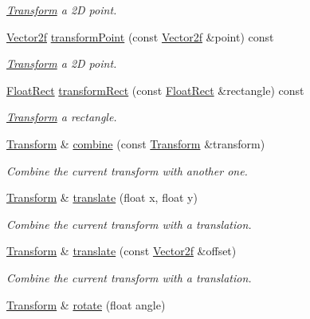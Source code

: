 \begin{DoxyCompactItemize}
\begin{DoxyCompactList}\small\item\em \hyperlink{classsf_1_1_transform}{Transform} a 2D point. \end{DoxyCompactList}\item 
\hyperlink{classsf_1_1_vector2}{Vector2f} \hyperlink{classsf_1_1_transform_ab42a0bb7a252c6d221004f6372ce5fdc}{transform\+Point} (const \hyperlink{classsf_1_1_vector2}{Vector2f} \&point) const
\begin{DoxyCompactList}\small\item\em \hyperlink{classsf_1_1_transform}{Transform} a 2D point. \end{DoxyCompactList}\item 
\hyperlink{classsf_1_1_rect}{Float\+Rect} \hyperlink{classsf_1_1_transform_a3824a20505d81a94bc22be1ffee57d3d}{transform\+Rect} (const \hyperlink{classsf_1_1_rect}{Float\+Rect} \&rectangle) const
\begin{DoxyCompactList}\small\item\em \hyperlink{classsf_1_1_transform}{Transform} a rectangle. \end{DoxyCompactList}\item 
\hyperlink{classsf_1_1_transform}{Transform} \& \hyperlink{classsf_1_1_transform_acd978f60421a0f839bb9a8263e8877ff}{combine} (const \hyperlink{classsf_1_1_transform}{Transform} \&transform)
\begin{DoxyCompactList}\small\item\em Combine the current transform with another one. \end{DoxyCompactList}\item 
\hyperlink{classsf_1_1_transform}{Transform} \& \hyperlink{classsf_1_1_transform_ab54f6c8070cc05e2afcb3145fbf4395a}{translate} (float x, float y)
\begin{DoxyCompactList}\small\item\em Combine the current transform with a translation. \end{DoxyCompactList}\item 
\hyperlink{classsf_1_1_transform}{Transform} \& \hyperlink{classsf_1_1_transform_a452ff6e32d5120fa8c132c1bf0ad83cd}{translate} (const \hyperlink{classsf_1_1_vector2}{Vector2f} \&offset)
\begin{DoxyCompactList}\small\item\em Combine the current transform with a translation. \end{DoxyCompactList}\item 
\hyperlink{classsf_1_1_transform}{Transform} \& \hyperlink{classsf_1_1_transform_a3e548c3c9e3fb9d4bd43cf852669e555}{rotate} (float angle)

\end{DoxyCompactItemize}
